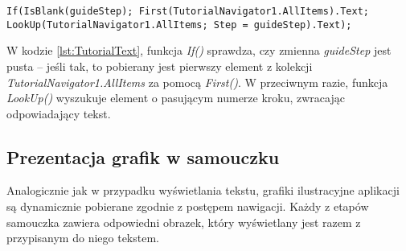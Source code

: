 \begin{lstlisting}[language=PowerFx]
If(IsBlank(guideStep); First(TutorialNavigator1.AllItems).Text; LookUp(TutorialNavigator1.AllItems; Step = guideStep).Text);
\end{lstlisting}

W kodzie \ref{lst:TutorialText}, funkcja \emph{If()} sprawdza, czy zmienna \emph{guideStep} jest pusta -- jeśli tak, to pobierany jest pierwszy element z kolekcji \emph{TutorialNavigator1.AllItems} za pomocą \emph{First()}. W przeciwnym razie, funkcja \emph{LookUp()} wyszukuje element o pasującym numerze kroku, zwracając odpowiadający tekst.

\subsection{Prezentacja grafik w samouczku}

Analogicznie jak w przypadku wyświetlania tekstu, grafiki ilustracyjne aplikacji są dynamicznie pobierane zgodnie z postępem nawigacji. Każdy z etapów samouczka zawiera odpowiedni obrazek, który wyświetlany jest razem z przypisanym do niego tekstem.
